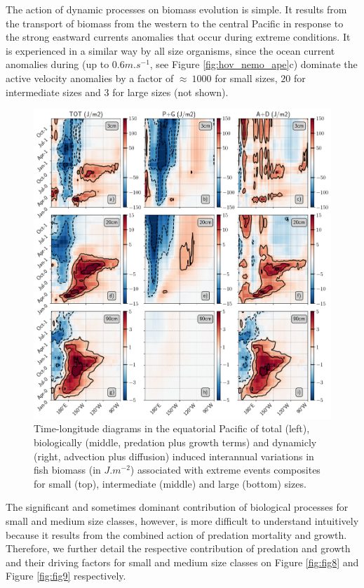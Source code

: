 The action of dynamic processes on biomass evolution is simple. It results from the transport of biomass from the western to the central Pacific in response to the strong eastward currents anomalies that occur during extreme \nino{} conditions. It is experienced in a similar way by all size organisms, since the ocean current anomalies during \nino{} (up to $0.6 m.s^{-1}$, see Figure \ref{fig:hov_nemo_ape}c) dominate the active velocity anomalies by a factor of $\approx\ 1000$ for small sizes, $20$ for intermediate sizes and $3$ for large sizes (not shown). 

\begin{figure}[h!tp]
	\centering
	\includegraphics[scale=0.4]{figs/fig7.png}	
	\caption{Time-longitude diagrams in the equatorial Pacific of total (left), biologically (middle, predation plus growth terms) and dynamicly (right, advection plus diffusion) induced interannual variations in fish biomass (in $J.m^{-2}$) associated with extreme \nino{} events composites for small (top), intermediate (middle) and large (bottom) sizes.}
	\label{fig:fig7}
\end{figure}

The significant and sometimes dominant contribution of biological processes for small and medium size classes, however, is more difficult to understand intuitively because it results from the combined action of predation mortality and growth. Therefore, we further detail the respective contribution of predation and growth and their driving factors for small and medium size classes on Figure \ref{fig:fig8} and Figure \ref{fig:fig9} respectively.

